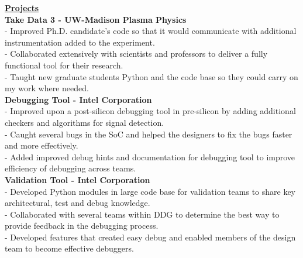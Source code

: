 \documentclass[12pt]{article}
\newcommand\ttab[1][1cm]{\hspace*{#1}}
\newcommand{\longunderline}[1]{\uline{#1\hfill\mbox{}}}
\begin{document}
\begin{flushleft}
\longunderline{\textbf{\large Projects}} \\[2mm]
\textbf{Take Data 3 - UW-Madison Plasma Physics} \\%
{\footnotesize
	\ttab- Improved Ph.D. candidate's code so that it would communicate with additional instrumentation added to the experiment. \\
	\ttab - Collaborated extensively with scientists and professors to deliver a fully functional tool for their research. \\
	\ttab - Taught new graduate students Python and the code base so they could carry on my work where needed. 
}
\\[2mm]
\textbf{Debugging Tool - Intel Corporation} \\%
{\footnotesize
	\ttab- Improved upon a post-silicon debugging tool in pre-silicon by adding additional checkers and algorithms for signal detection.\\
	\ttab- Caught several bugs in the SoC and helped the designers to fix the bugs faster and more effectively. \\
	\ttab- Added improved debug hints and documentation for debugging tool to improve efficiency of debugging across teams. \\[2mm]
}
\textbf{Validation Tool - Intel Corporation} \\
{\footnotesize
	\ttab- Developed Python modules in large code base for validation teams to share key architectural, test and debug knowledge. \\
	\ttab- Collaborated with several teams within DDG to determine the best way to provide feedback in the debugging process. \\
	\ttab -  Developed features that created easy debug and enabled members of the design team to become effective debuggers. \\[4mm]
}



\end{flushleft}
\end{document}
